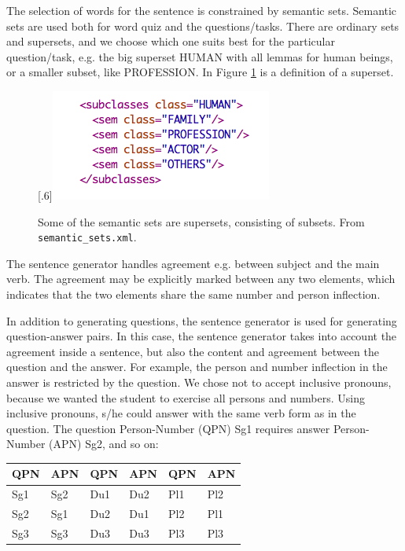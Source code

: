 \documentclass[a4paper,12pt]{article}
\begin{document}
The selection of words for the sentence is constrained by semantic sets. Semantic sets are used both for word quiz and the questions/tasks. There are ordinary sets and supersets, and we choose which one suits best for the particular question/task, e.g. the big superset HUMAN with all lemmas for human beings, or a smaller subset, like PROFESSION. In Figure \ref{semset} is a definition of a superset. 

\begin{figure}[htbp]
\begin{center}
\scalebox{.6}[.6]{\includegraphics{img/semantic_set.png}}\\
\caption{Some of the semantic sets are supersets, consisting of subsets. From \texttt{semantic\_sets.xml}.}
\label{semset}
\end{center}
\end{figure}


The sentence generator handles agreement e.g. between subject and the main verb. The agreement may be explicitly marked between any two elements, which indicates that the two elements share the same number and person inflection.

In addition to generating questions, the sentence generator is used for generating question-answer pairs. In this case, the sentence generator takes into account the agreement inside a sentence, but also the content and agreement between the question and the answer. For example, the person and number inflection in the answer is restricted by the question. We chose not to accept inclusive pronouns, because we wanted the student to exercise all persons and numbers. Using inclusive pronouns, s/he could answer with the same verb form as in the question. The question Person-Number (QPN) Sg1 requires answer Person-Number (APN) Sg2, and so on:\\

\begin{tabular}[t]{ll|ll|ll}
QPN &APN &QPN &APN &QPN &APN \\
\hline
Sg1 &Sg2 &Du1 &Du2 &Pl1 &Pl2 \\
Sg2 &Sg1 &Du2 &Du1 &Pl2 &Pl1 \\
Sg3 &Sg3 &Du3 &Du3 &Pl3 &Pl3 \\
\hline
\end{tabular}
\end{document}
